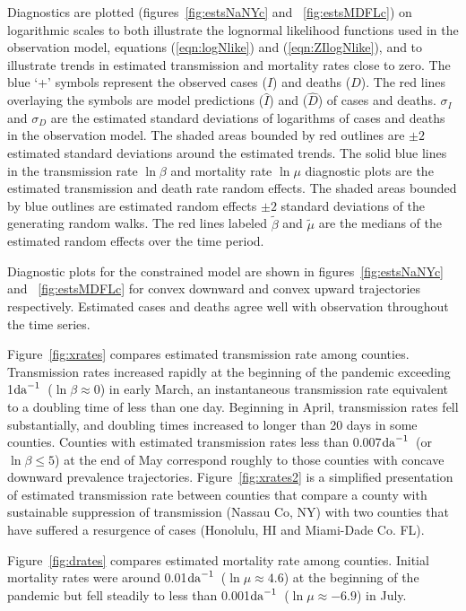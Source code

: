 \documentclass[12pt,letterpaper]{article}
\newcommand\perda{$\rm{da}^{-1}$}
\begin{document}
Diagnostics are plotted
(figures~\ref{fig:estsNaNYc} and~ \ref{fig:estsMDFLc})
on logarithmic scales to both illustrate the
lognormal likelihood functions used in the observation model,
equations (\ref{eqn:logNlike}) and (\ref{eqn:ZIlogNlike}), and to
illustrate trends in estimated transmission and mortality rates close
to zero.
\label{pp:diagexpl} 
The blue `+' symbols represent the observed cases ($I$) and deaths ($D$).
The red lines overlaying the symbols are model predictions ($\widehat{I}$)
and ($\widehat{D}$) of cases and deaths. 
$\sigma_I$ and $\sigma_D$ are the estimated standard deviations of
logarithms of cases and deaths in the observation model.
The shaded areas bounded by red outlines are 
$\pm 2$ estimated standard deviations around the estimated trends.
The solid blue lines in the transmission rate $\ln \beta$ and
mortality rate $\ln \mu$ diagnostic plots are the estimated
transmission and death rate random effects.
The shaded areas bounded by blue outlines are
estimated random effects $\pm 2$ standard deviations of the generating
random walks.
The red lines labeled $\tilde{\beta}$ and $\tilde{\mu}$ are the
medians of the estimated random effects over the time period.

Diagnostic plots for the constrained model are shown in
figures~\ref{fig:estsNaNYc} and~ \ref{fig:estsMDFLc}
for convex downward and convex upward trajectories
respectively.
Estimated cases and deaths agree well with observation throughout the
time series.

Figure~\ref{fig:xrates} compares estimated transmission rate among
counties.
Transmission rates increased rapidly at the beginning of the pandemic
exceeding  1\perda\ ($\ln \beta \approx 0$) in early March, 
an instantaneous transmission rate
equivalent to a doubling time of less than one day.
Beginning in April, transmission rates fell substantially, and doubling times
increased to longer than 20 days in some counties.
Counties with estimated transmission rates less than 0.007\perda\ 
(or $\ln \beta \le 5$) at the end of May
correspond roughly to those counties with concave downward prevalence
trajectories.
Figure~\ref{fig:xrates2} is a simplified presentation of estimated
transmission rate between counties that compare a county with sustainable
suppression of transmission (Nassau Co, NY) with two counties that
have suffered a resurgence of cases (Honolulu, HI and Miami-Dade Co.
FL). 

Figure~\ref{fig:drates} compares estimated mortality rate among
counties. Initial mortality rates were around 
0.01\perda\ ($\ln \mu \approx 4.6$) at the beginning of
the pandemic but fell steadily to less than 
0.001\perda\ ($\ln \mu \approx -6.9$) in July.
\end{document}
